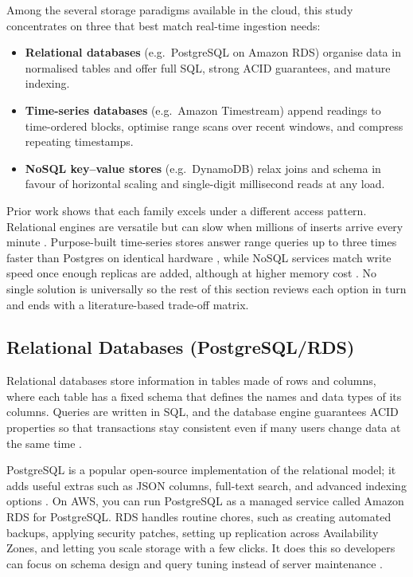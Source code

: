 \documentclass[nomenclature, english, biblatex]{kththesis}
\numberwithin{listing}{chapter}
\begin{document}
Among the several storage paradigms available in the cloud, this study concentrates on three that best match real-time ingestion needs:

\begin{itemize}[leftmargin=*]
  \item \textbf{Relational databases} (e.g.\ PostgreSQL on Amazon RDS) organise data in normalised tables and offer full SQL, strong \gls{ACID} guarantees, and mature indexing.  
  \item \textbf{Time-series databases} (e.g.\ Amazon Timestream) append readings to time-ordered blocks, optimise range scans over recent windows, and compress repeating timestamps.  
  \item \textbf{NoSQL key–value stores} (e.g.\ DynamoDB) relax joins and schema in favour of horizontal scaling and single-digit millisecond reads at any load.  
\end{itemize}

\noindent
Prior work shows that each family excels under a different access pattern. Relational engines are versatile but can slow when millions of inserts arrive every minute \cite{Heldt2021SciTS}. Purpose-built time-series stores answer range queries up to three times faster than Postgres on identical hardware \cite{Grzesik2020EdgeIoTBenchmark}, while NoSQL services match write speed once enough replicas are added, although at higher memory cost \cite{Vergara2021PerformanceTSDB}. No single solution is universally  so the rest of this section reviews each option in turn and ends with a literature-based trade-off matrix.

\subsection{Relational Databases (PostgreSQL/RDS)}
Relational databases store information in tables made of rows and columns, where each table has a fixed schema that defines the names and data types of its columns. Queries are written in SQL, and the database engine guarantees \gls{ACID} properties so that transactions stay consistent even if many users change data at the same time \cite[Chs.~1–2]{Silberschatz2020DB}.

PostgreSQL is a popular open-source implementation of the relational model; it adds useful extras such as JSON columns, full-text search, and advanced indexing options \cite[Ch.~27]{Silberschatz2020DB}. On AWS, you can run PostgreSQL as a managed service called Amazon RDS for PostgreSQL. RDS handles routine chores, such as creating automated backups, applying security patches, setting up replication across Availability Zones, and letting you scale storage with a few clicks. It does this so developers can focus on schema design and query tuning instead of server maintenance \cite{AWSRDSPostgreSQL}.
\end{document}
